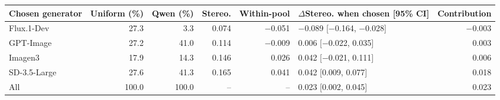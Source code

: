 

\scriptsize
\begin{tabular*}{\textwidth}{@{\extracolsep{\fill}}lrrrrlr}
\toprule
Chosen generator & Uniform (\%) & Qwen (\%) & Stereo. & Within-pool & $\Delta$Stereo. when chosen [95\% CI] & Contribution\\
\midrule
Flux.1-Dev & 27.3 & 3.3 & 0.074 & $-$0.051 & $-$0.089 [$-$0.164, $-$0.028] & $-$0.003\\
GPT-Image & 27.2 & 41.0 & 0.114 & $-$0.009 & 0.006 [$-$0.022, 0.035] & 0.003\\
Imagen3 & 17.9 & 14.3 & 0.146 & 0.026 & 0.042 [$-$0.021, 0.111] & 0.006\\
SD-3.5-Large & 27.6 & 41.3 & 0.165 & 0.041 & 0.042 [0.009, 0.077] & 0.018\\
All & 100.0 & 100.0 & -- & -- & 0.023 [0.002, 0.045] & 0.023\\
\bottomrule
\end{tabular*}
